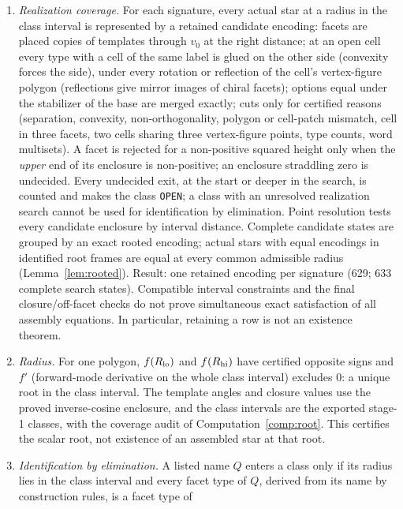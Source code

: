 \documentclass[11pt]{article}
\theoremstyle{definition}
\theoremstyle{remark}
\begin{document}
\begin{enumerate}[leftmargin=2em]
\item \emph{Realization coverage.} For each signature, every actual star
  at a radius in the class interval is represented by a retained candidate
  encoding: facets are
  placed copies of templates through $v_0$ at the right distance; at an
  open cell every type with a cell of the same label is glued on the other
  side (convexity forces the side), under every rotation or reflection of
  the cell's vertex-figure polygon (reflections give mirror images of
  chiral facets); options equal under the stabilizer of the base are
  merged exactly; cuts only for certified reasons (separation, convexity,
  non-orthogonality, polygon or cell-patch mismatch, cell in three facets,
  two cells sharing three vertex-figure points, type counts, word
  multisets). A facet is rejected for a non-positive squared height only
  when the \emph{upper} end of its enclosure is non-positive; an enclosure
  straddling zero is undecided. Every undecided exit, at the start or
  deeper in the search, is counted and makes the class \texttt{OPEN}; a
  class with an unresolved realization search cannot be used for
  identification by elimination. Point resolution tests every candidate
  enclosure by interval distance.
  Complete candidate states are grouped by an exact rooted encoding;
  actual stars with equal encodings in identified root frames are equal
  at every common admissible radius (Lemma~\ref{lem:rooted}). Result:
  one retained encoding per signature (629; 633 complete search states).
  Compatible interval constraints and the final closure/off-facet checks
  do not prove simultaneous exact satisfaction of all assembly equations.
  In particular, retaining a row is not an existence theorem.
\item \emph{Radius.} For one polygon, $f(R_{\rm lo})$ and $f(R_{\rm hi})$
  have certified opposite signs and $f'$ (forward-mode derivative on the
  whole class interval) excludes 0: a unique root in the class interval.
  The template angles and closure values use the proved inverse-cosine
  enclosure, and the class intervals are the exported stage-1 classes,
  with the coverage audit of Computation~\ref{comp:root}. This certifies
  the scalar root, not existence of an assembled star at that root.
\item \emph{Identification by elimination.} A listed name $Q$ enters a
  class only if its radius lies in the class interval and every facet type
  of $Q$, derived from its name by construction rules, is a facet type of

\end{enumerate}
\end{document}

